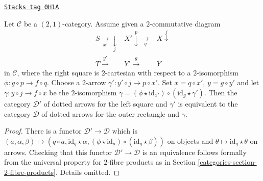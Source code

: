 \begin{lemma}
\label{categories-lemma-cat-dotted-arrows-base-change}
\href{https://stacks.math.columbia.edu/tag/0H1A}{\texttt{Stacks tag 0H1A}}

Let $\mathcal{C}$ be a $(2,1)$-category. Assume given a $2$-commutative diagram
$$
\begin{array}{ccc}S \underset{x'}{\longrightarrow}\underset{j}{\downarrow} & X' \overset{p}{\downarrow}\underset{q}{\longrightarrow} & X \overset{f}{\downarrow} \\ T \overset{y'}{\longrightarrow} & Y' \overset{g}{\longrightarrow} & Y\end{array}
$$
in $\mathcal{C}$, where the right square is $2$-cartesian
with respect to a $2$-isomorphism $\phi \colon g \circ p \to f \circ q$.
Choose a $2$-arrow
$\gamma' : y' \circ j \to p \circ x'$. Set
$x = q \circ x'$, $y = g \circ y'$ and let
$\gamma : y \circ j \to f \circ x$ be the $2$-isomorphism
$\gamma = (\phi \star \text{id}_{x'}) \circ (\text{id}_g \star \gamma')$.
Then the category $\mathcal{D}'$ of dotted arrows
for the left square and $\gamma'$ is equivalent to the category
$\mathcal{D}$ of dotted
arrows for the outer rectangle and $\gamma$.
\end{lemma}

\begin{proof}
There is a functor $\mathcal{D}' \to \mathcal{D}$ which is
$(a, \alpha, \beta) \mapsto (q \circ a, \text{id}_q \star \alpha,
(\phi \star \text{id}_a) \circ (\text{id}_g \star \beta))$
on objects and $\theta \mapsto \text{id}_q \star \theta$ on arrows.
Checking that this functor $\mathcal{D}' \to \mathcal{D}$ is an equivalence
follows formally from the universal property for $2$-fibre products
as in Section \ref{categories-section-2-fibre-products}. Details omitted.
\end{proof}


